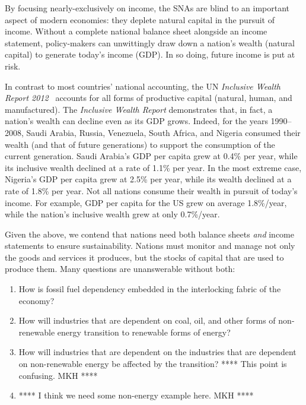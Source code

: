 By focusing nearly-exclusively on income, 
the SNAs are blind to an important aspect of modern economies:
they deplete natural capital in the pursuit of income.
Without a complete national balance sheet alongside an income statement, 
policy-makers can unwittingly draw down a nation's wealth (natural capital) 
to generate today's income (GDP). 
In so doing, future income is put at risk. 

In contrast to most countries' national accounting, 
the UN \emph{Inclusive Wealth Report 2012}~\cite{IWR2012} 
accounts for all forms of productive capital 
(natural, human, and manufactured). 
The \emph{Inclusive Wealth Report} demonstrates that, in fact, 
a nation's wealth can decline even as its GDP grows. 
Indeed, for the years 1990--2008, Saudi Arabia, Russia, Venezuela, South Africa, and Nigeria 
consumed their wealth (and that of future generations) 
to support the consumption of the current generation.
Saudi Arabia's GDP per capita grew at 0.4\% per year, 
while its inclusive wealth declined at a rate of 1.1\% per year. 
In the most extreme case, Nigeria's GDP per capita grew at 2.5\% per year, 
while its wealth declined at a rate of 1.8\% per year.
Not all nations consume their wealth in pursuit of today's income.
For example, GDP per capita for the US grew on average 1.8\%/year, 
while the nation's inclusive wealth grew at only 0.7\%/year.\cite[p.~44]{IWR2012}  

Given the above, we contend that nations need both 
balance sheets \emph{and} 
income statements
to ensure sustainability. 
Nations must monitor and manage not only the goods and services it produces, 
but the stocks of capital that are used to produce them. 
Many questions are unanswerable without both:

\begin{enumerate}
    \item{How is fossil fuel dependency embedded in the interlocking fabric of the economy?} 
    \item{How will industries that are dependent on coal, oil, 
 			and other forms of non-renewable energy transition 
			to renewable forms of energy?} 
    \item{How will industries that are dependent 
 			on the industries that are dependent on non-renewable energy 
			be affected by the transition? **** This point is confusing. MKH ****} 
	\item{**** I think we need some non-energy example here. MKH ****}
\end{enumerate}

